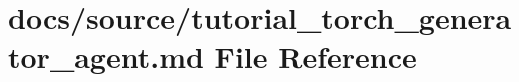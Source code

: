 \hypertarget{tutorial__torch__generator__agent_8md}{}\section{docs/source/tutorial\+\_\+torch\+\_\+generator\+\_\+agent.md File Reference}
\label{tutorial__torch__generator__agent_8md}
